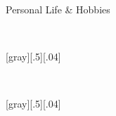 \begin{frame}[t]{Personal Life \& Hobbies}
%
  \begin{minipage}[c][.8\textheight][t]{.3\textwidth}\centering
    \\[5ex]
  \end{minipage}[gray][.5][.04]
%
  \begin{minipage}[c][.8\textheight][t]{.29\textwidth}\centering
    \\[3ex]
  \end{minipage}[gray][.5][.04]
%
  \begin{minipage}[c][.8\textheight][t]{.3\textwidth}\centering
    \\[5ex]
  \end{minipage}
%
\end{frame}
